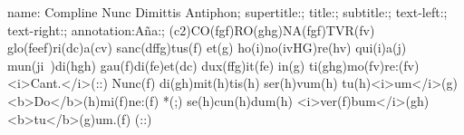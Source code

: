 name: Compline Nunc Dimittis Antiphon;
supertitle:;
title:;
subtitle:;
text-left:;
text-right:;
annotation:Aña:;
(c2)CO(fgf)RO(ghg)NA(fgf)TVR(fv) glo(feef)ri(dc)a(cv) sanc(dffg)tus(f) et(g) ho(i)no(ivHG)re(hv) qui(i)a(j) mun(ji~)di(hgh) gau(f)di(fe)et(dc) dux(ffg)it(fe) in(g) ti(ghg)mo(fv)re:(fv) <i>Cant.</i>(::) Nunc(f) di(gh)mit(h)tis(h) ser(h)vum(h) tu(h)<i>um</i>(g) <b>Do</b>(h)mi(f)ne:(f) *(;) se(h)cun(h)dum(h) <i>ver(f)bum</i>(gh) <b>tu</b>(g)um.(f) (::)